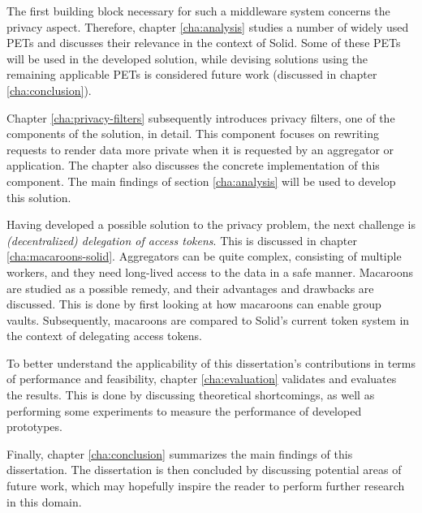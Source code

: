 The first building block necessary for such a middleware system concerns the privacy aspect. Therefore, chapter \ref{cha:analysis} studies a number of widely used \acrfull{PETs} and discusses their relevance in the context of Solid. Some of these \gls{PETs} will be used in the developed solution, while devising solutions using the remaining applicable \gls{PETs} is considered future work (discussed in chapter \ref{cha:conclusion}).

Chapter \ref{cha:privacy-filters} subsequently introduces privacy filters, one of the components of the solution, in detail. This component focuses on rewriting requests to render data more private when it is requested by an aggregator or application. The chapter also discusses the concrete implementation of this component. The main findings of section \ref{cha:analysis} will be used to develop this solution.

Having developed a possible solution to the privacy problem, the next challenge is \textit{(decentralized) delegation of access tokens}. This is discussed in chapter \ref{cha:macaroons-solid}. Aggregators can be quite complex, consisting of multiple workers, and they need long-lived access to the data in a safe manner. Macaroons are studied as a possible remedy, and their advantages and drawbacks are discussed. This is done by first looking at how macaroons can enable group vaults. Subsequently, macaroons are compared to Solid's current token system in the context of delegating access tokens.

\noindent To better understand the applicability of this dissertation's contributions in terms of performance and feasibility, chapter \ref{cha:evaluation} validates and evaluates the results. This is done by discussing theoretical shortcomings, as well as performing some experiments to measure the performance of developed prototypes. 

Finally, chapter \ref{cha:conclusion} summarizes the main findings of this dissertation. The dissertation is then concluded by discussing potential areas of future work, which may hopefully inspire the reader to perform further research in this domain.
